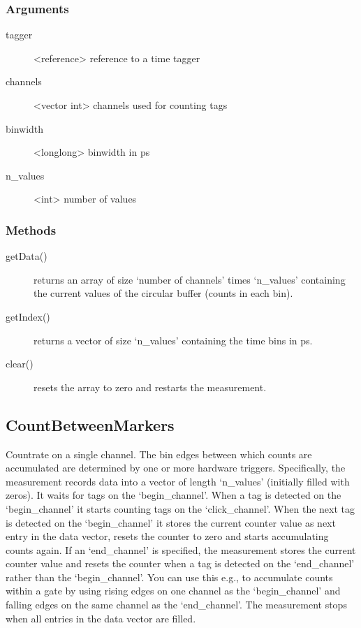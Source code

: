 \documentclass[letterpaper,10pt,english]{sphinxmanual}
\begin{document}
\subsubsection{Arguments}
\label{sections/api:id2}\begin{description}
\item[{tagger}] \leavevmode
\textless{}reference\textgreater{} reference to a time tagger

\item[{channels}] \leavevmode
\textless{}vector int\textgreater{} channels used for counting tags

\item[{binwidth}] \leavevmode
\textless{}longlong\textgreater{} binwidth in ps

\item[{n\_values}] \leavevmode
\textless{}int\textgreater{} number of values

\end{description}


\subsubsection{Methods}
\label{sections/api:id3}\begin{description}
\item[{getData()}] \leavevmode
returns an array of size `number of channels' times `n\_values' containing the current values of the circular buffer
(counts in each bin).

\item[{getIndex()}] \leavevmode
returns a vector of size `n\_values' containing the time bins in ps.

\item[{clear()}] \leavevmode
resets the array to zero and restarts the measurement.

\end{description}


\subsection{CountBetweenMarkers}
\label{sections/api:countbetweenmarkers}
Countrate on a single channel. The bin edges between which counts are accumulated
are determined by one or more hardware triggers. Specifically, the measurement records data into a vector of length `n\_values' (initially filled with zeros).
It waits for tags on the `begin\_channel'. When a tag is detected on the `begin\_channel' it starts counting tags
on the `click\_channel'. When the next tag is detected on the `begin\_channel' it stores the current counter value as next entry in the data vector,
resets the counter to zero and starts accumulating counts again. If an `end\_channel' is specified, the measurement stores the current counter value and resets the counter
when a tag is detected on the `end\_channel' rather than the `begin\_channel'. You can use this e.g., to accumulate counts within a gate by using
rising edges on one channel as the `begin\_channel' and falling edges on the same channel as the `end\_channel'. The measurement stops when all
entries in the data vector are filled.
\end{document}
